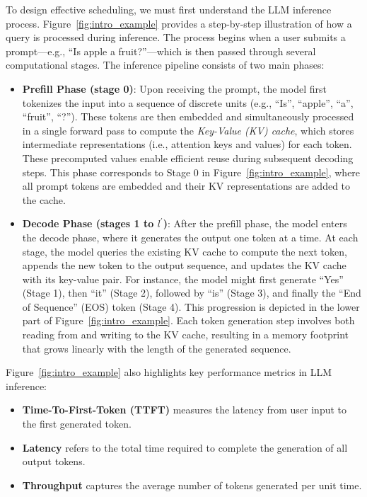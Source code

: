 To design effective scheduling, we must first understand the LLM inference process. Figure~\ref{fig:intro_example} provides a step-by-step illustration of how a query is processed during inference. The process begins when a user submits a prompt—e.g., ``Is apple a fruit?''—which is then passed through several computational stages. The inference pipeline consists of two main phases:
\begin{itemize}
    \item \textbf{Prefill Phase (stage 0)}: Upon receiving the prompt, the model first tokenizes the input into a sequence of discrete units (e.g., ``Is'', ``apple'', ``a'', ``fruit'', ``?''). These tokens are then embedded and simultaneously processed in a single forward pass to compute the \textit{Key-Value (KV) cache}, which stores intermediate representations (i.e., attention keys and values) for each token. These precomputed values enable efficient reuse during subsequent decoding steps. This phase corresponds to Stage 0 in Figure~\ref{fig:intro_example}, where all prompt tokens are embedded and their KV representations are added to the cache.

    \item \textbf{Decode Phase (stages 1 to $l^\prime$)}: After the prefill phase, the model enters the decode phase, where it generates the output one token at a time. At each stage, the model queries the existing KV cache to compute the next token, appends the new token to the output sequence, and updates the KV cache with its key-value pair. For instance, the model might first generate ``Yes'' (Stage 1), then ``it'' (Stage 2), followed by ``is'' (Stage 3), and finally the ``End of Sequence'' (EOS) token (Stage 4). This progression is depicted in the lower part of Figure~\ref{fig:intro_example}. Each token generation step involves both reading from and writing to the KV cache, resulting in a memory footprint that grows linearly with the length of the generated sequence.
\end{itemize}

Figure~\ref{fig:intro_example} also highlights key performance metrics in LLM inference:
\begin{itemize}
    \item \textbf{Time-To-First-Token (TTFT)} measures the latency from user input to the first generated token.
    \item \textbf{Latency} refers to the total time required to complete the generation of all output tokens.
    \item \textbf{Throughput} captures the average number of tokens generated per unit time.
\end{itemize}

